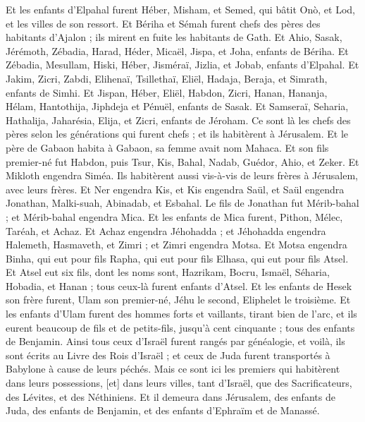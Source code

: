 \begin{multicols}{2}
Et les enfants d'Elpahal furent Héber, Misham, et Semed, qui bâtit Onò, et Lod, et les villes de son ressort.
Et Bériha et Sémah furent chefs des pères des habitants d'Ajalon ; ils mirent en fuite les habitants de Gath.
Et Ahio, Sasak, Jérémoth,
Zébadia, Harad, Héder,
Micaël, Jispa, et Joha, enfants de Bériha.
Et Zébadia, Mesullam, Hiski, Héber,
Jisméraï, Jizlia, et Jobab, enfants d'Elpahal.
Et Jakim, Zicri, Zabdi,
Elihenaï, Tsillethaï, Eliël,
Hadaja, Beraja, et Simrath, enfants de Simhi.
Et Jispan, Héber, Eliël,
Habdon, Zicri, Hanan,
Hananja, Hélam, Hantothija,
Jiphdeja et Pénuël, enfants de Sasak.
Et Samseraï, Seharia, Hathalija,
Jaharésia, Elija, et Zicri, enfants de Jéroham.
Ce sont là les chefs des pères selon les générations qui furent chefs ; et ils habitèrent à Jérusalem.
Et le père de Gabaon habita à Gabaon, sa femme avait nom Mahaca.
Et son fils premier-né fut Habdon, puis Tsur, Kis, Bahal, Nadab,
Guédor, Ahio, et Zeker.
Et Mikloth engendra Siméa. Ils habitèrent aussi vis-à-vis de leurs frères à Jérusalem, avec leurs frères.
Et Ner engendra Kis, et Kis engendra Saül, et Saül engendra Jonathan, Malki-suah, Abinadab, et Esbahal.
Le fils de Jonathan fut Mérib-bahal ; et Mérib-bahal engendra Mica.
Et les enfants de Mica furent, Pithon, Mélec, Taréah, et Achaz.
Et Achaz engendra Jéhohadda ; et Jéhohadda engendra Halemeth, Hasmaveth, et Zimri ; et Zimri engendra Motsa.
Et Motsa engendra Binha, qui eut pour fils Rapha, qui eut pour fils Elhasa, qui eut pour fils Atsel.
Et Atsel eut six fils, dont les noms sont, Hazrikam, Bocru, Ismaël, Séharia, Hobadia, et Hanan ; tous ceux-là furent enfants d'Atsel.
Et les enfants de Hesek son frère furent, Ulam son premier-né, Jéhu le second, Eliphelet le troisième.
Et les enfants d'Ulam furent des hommes forts et vaillants, tirant bien de l'arc, et ils eurent beaucoup de fils et de petits-fils, jusqu'à cent cinquante ; tous des enfants de Benjamin.
\VerseOne{}Ainsi tous ceux d'Israël furent rangés par généalogie, et voilà, ils sont écrits au Livre des Rois d'Israël ; et ceux de Juda furent transportés à Babylone à cause de leurs péchés.
Mais ce sont ici les premiers qui habitèrent dans leurs possessions, [et] dans leurs villes, tant d'Israël, que des Sacrificateurs, des Lévites, et des Néthiniens.
Et il demeura dans Jérusalem, des enfants de Juda, des enfants de Benjamin, et des enfants d'Ephraïm et de Manassé.

\end{multicols}
